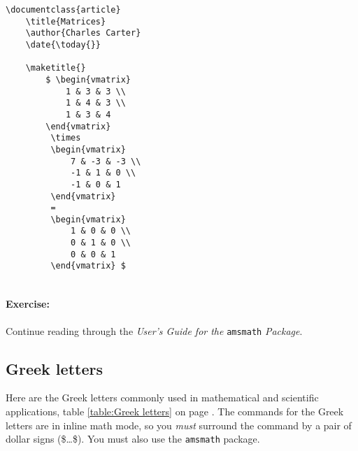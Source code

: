         \begin{verbatim}
\documentclass{article}
    \title{Matrices}
    \author{Charles Carter}
    \date{\today{}}
 
    \maketitle{}
        $ \begin{vmatrix}
            1 & 3 & 3 \\
            1 & 4 & 3 \\
            1 & 3 & 4 
        \end{vmatrix}
         \times 
         \begin{vmatrix}
             7 & -3 & -3 \\
             -1 & 1 & 0 \\
             -1 & 0 & 1
         \end{vmatrix}
         =
         \begin{vmatrix}
             1 & 0 & 0 \\
             0 & 1 & 0 \\
             0 & 0 & 1
         \end{vmatrix} $
    
        \end{verbatim}

		\paragraph{Exercise:}Continue reading through the \textit{User's Guide for the }\texttt{amsmath} \textit{Package}.

        \subsection{Greek letters}
        \label{Greek letters}
        
        Here are the Greek letters commonly used in mathematical and scientific applications, table \ref{table:Greek letters} on page \pageref{table:Greek letters}. The \Lx{} commands for the Greek letters are in inline math mode, so you \textit{must} surround the command by a pair of dollar signs (\$\ldots\$). You must also use the \texttt{amsmath} package.

